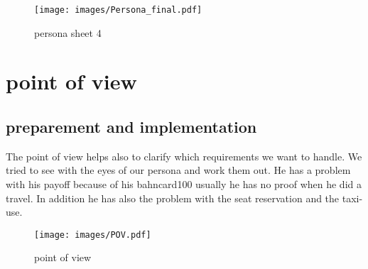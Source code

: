 \begin{figure}[!h]
	\texttt{[image: images/Persona\_final.pdf]}
	\caption{persona sheet 4}
	\label{fig:persona4}
\end{figure}

\section{point of view}

\subsection{preparement and  implementation}

The point of view helps also to clarify which requirements we want to handle. We tried to see with the eyes of our persona and
work them out. He has a problem with his payoff because of his bahncard100 usually he has no proof when he did a travel. In
addition he has also the problem with the seat reservation and the taxi-use.

\begin{figure}[!h]
	\texttt{[image: images/POV.pdf]}
	\caption{point of view}
	\label{fig:pov}
\end{figure}

\clearpage

